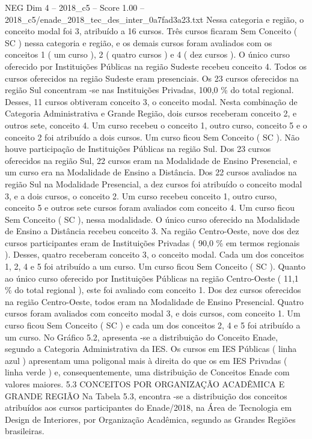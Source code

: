 \begin{textsample}{NEG Dim 4 – 2018\_c5 – Score 1.00 – 2018\_c5/enade\_2018\_tec\_des\_inter\_0a7fad3a23.txt}
Nessa categoria e região, o conceito modal foi 3, atribuído a 16 cursos.
Três cursos ficaram Sem Conceito ( SC ) nessa categoria e região, e os demais cursos foram avaliados com os conceitos 1 ( um curso ), 2 ( quatro cursos ) e 4 ( dez cursos ).
O único curso oferecido por Instituições Públicas na região Sudeste recebeu conceito 4.
Todos os cursos oferecidos na região Sudeste eram presenciais.
Os 23 cursos oferecidos na região Sul concentram -se nas Instituições Privadas, 100,0 \% do total regional.
Desses, 11 cursos obtiveram conceito 3, o conceito modal.
Nesta combinação de Categoria Administrativa e Grande Região, dois cursos receberam conceito 2, e outros sete, conceito 4.
Um curso recebeu o conceito 1, outro curso, conceito 5 e o conceito 2 foi atribuído a dois cursos.
Um curso ficou Sem Conceito ( SC ).
Não houve participação de Instituições Públicas na região Sul.
Dos 23 cursos oferecidos na região Sul, 22 cursos eram na Modalidade de Ensino Presencial, e um curso era na Modalidade de Ensino a Distância.
Dos 22 cursos avaliados na região Sul na Modalidade Presencial, a dez cursos foi atribuído o conceito modal 3, e a dois cursos, o conceito 2.
Um curso recebeu conceito 1, outro curso, conceito 5 e outros sete cursos foram avaliados com conceito 4.
Um curso ficou Sem Conceito ( SC ), nessa modalidade.
O único curso oferecido na Modalidade de Ensino a Distância recebeu conceito 3.
Na região Centro-Oeste, nove dos dez cursos participantes eram de Instituições Privadas ( 90,0 \% em termos regionais ).
Desses, quatro receberam conceito 3, o conceito modal.
Cada um dos conceitos 1, 2, 4 e 5 foi atribuído a um curso.
Um curso ficou Sem Conceito ( SC ).
Quanto ao único curso oferecido por Instituições Públicas na região Centro-Oeste ( 11,1 \% do total regional ), este foi avaliado com conceito 1.
Dos dez cursos oferecidos na região Centro-Oeste, todos eram na Modalidade de Ensino Presencial.
Quatro cursos foram avaliados com conceito modal 3, e dois cursos, com conceito 1.
Um curso ficou Sem Conceito ( SC ) e cada um dos conceitos 2, 4 e 5 foi atribuído a um curso.
No Gráfico 5.2, apresenta -se a distribuição do Conceito Enade, segundo a Categoria Administrativa da IES.
Os cursos em IES Públicas ( linha azul ) apresentam uma poligonal mais à direita do que os em IES Privadas ( linha verde ) e, consequentemente, uma distribuição de Conceitos Enade com valores maiores. 5.3 CONCEITOS POR ORGANIZAÇÃO ACADÊMICA E GRANDE REGIÃO Na Tabela 5.3, encontra -se a distribuição dos conceitos atribuídos aos cursos participantes do Enade/2018, na Área de Tecnologia em Design de Interiores, por Organização Acadêmica, segundo as Grandes Regiões brasileiras.

\end{textsample}
